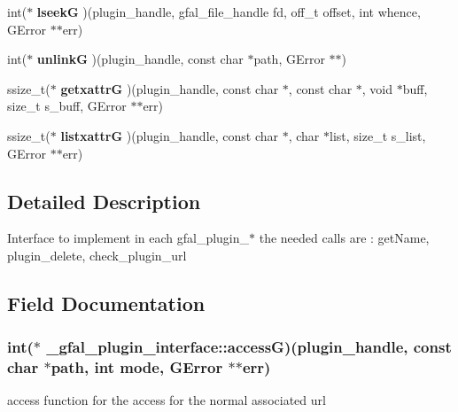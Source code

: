 \begin{CompactItemize}
\item 
int($\ast$ \textbf{lseek\-G} )(plugin\_\-handle, gfal\_\-file\_\-handle fd, off\_\-t offset, int whence, GError $\ast$$\ast$err)\label{struct__gfal__plugin__interface_424d4d77e29e5e4cfe92eae0d6a8bdc2}

\item 
int($\ast$ \textbf{unlink\-G} )(plugin\_\-handle, const char $\ast$path, GError $\ast$$\ast$)\label{struct__gfal__plugin__interface_75692c1e9487ff9ed7fce15dc2ddac62}

\item 
ssize\_\-t($\ast$ \textbf{getxattr\-G} )(plugin\_\-handle, const char $\ast$, const char $\ast$, void $\ast$buff, size\_\-t s\_\-buff, GError $\ast$$\ast$err)\label{struct__gfal__plugin__interface_9c6b4405f17d92e42aa40ff307188701}

\item 
ssize\_\-t($\ast$ \textbf{listxattr\-G} )(plugin\_\-handle, const char $\ast$, char $\ast$list, size\_\-t s\_\-list, GError $\ast$$\ast$err)\label{struct__gfal__plugin__interface_c3bae2e54ce8998722f03b588d423b18}

\end{CompactItemize}


\subsection{Detailed Description}
Interface to implement in each gfal\_\-plugin\_\-$\ast$ the needed calls are : get\-Name, plugin\_\-delete, check\_\-plugin\_\-url 



\subsection{Field Documentation}
\subsubsection{\setlength{\rightskip}{0pt plus 5cm}int($\ast$ \bf{\_\-gfal\_\-plugin\_\-interface::access\-G})(plugin\_\-handle, const char $\ast$path, int mode, GError $\ast$$\ast$err)}\label{struct__gfal__plugin__interface_1fa81d7a219629281c14b05116d32202}


access function for the access for the normal associated url 

